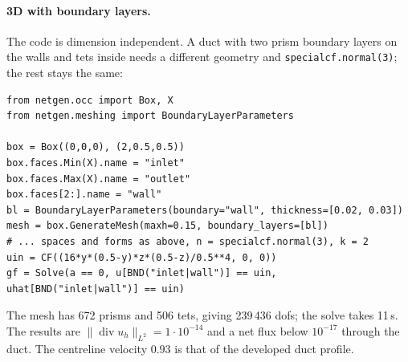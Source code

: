 \documentclass[10pt,a4paper]{article}
\newcommand{\code}[1]{\texttt{#1}}
\begin{document}
\paragraph{3D with boundary layers.}
The code is dimension independent. A duct with two prism boundary layers on the walls and tets inside needs a different geometry and \code{specialcf.normal(3)}; the rest stays the same:
\begin{lstlisting}
from netgen.occ import Box, X
from netgen.meshing import BoundaryLayerParameters

box = Box((0,0,0), (2,0.5,0.5))
box.faces.Min(X).name = "inlet"
box.faces.Max(X).name = "outlet"
box.faces[2:].name = "wall"
bl = BoundaryLayerParameters(boundary="wall", thickness=[0.02, 0.03])
mesh = box.GenerateMesh(maxh=0.15, boundary_layers=[bl])
# ... spaces and forms as above, n = specialcf.normal(3), k = 2
uin = CF((16*y*(0.5-y)*z*(0.5-z)/0.5**4, 0, 0))
gf = Solve(a == 0, u[BND("inlet|wall")] == uin, uhat[BND("inlet|wall")] == uin)
\end{lstlisting}
The mesh has 672 prisms and 506 tets, giving 239\,436 dofs; the solve takes 11\,s. The results are $\|\operatorname{div}u_h\|_{L^2} = 1\cdot10^{-14}$ and a net flux below $10^{-17}$ through the duct. The centreline velocity $0.93$ is that of the developed duct profile.
\end{document}
